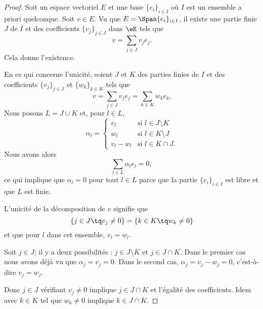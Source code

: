 \begin{proof}
    Soit un espace vectoriel \( E\) et une base \( \{ e_i \}_{i\in I}\) où \( I\) est un ensemble a priori quelconque. Soit \( v\in E\). Vu que \( E=\Span\{ e_i \}_{i\in I}\), il existe une partie finie \( J\) de \( I\) et des coefficients \( \{ v_j \}_{j\in J}\) dans \( \eK\) tels que
    \begin{equation}
        v=\sum_{j\in J}v_je_j.
    \end{equation}
    Cela donne l'existence.

    En ce qui concerne l'unicité, soient \( J \) et \( K\) des parties finies de \( I\) et des coefficients \( \{ v_j \}_{j\in J}\) et \( \{ w_{k} \}_{k\in K}\) tels que
    \begin{equation}
        v=\sum_{j\in J}v_je_j=\sum_{k\in K}w_{k}e_{k}.
    \end{equation}
    Nous posons \( L=J\cup K\) et, pour \( l\in L\),
    \begin{equation}
        \alpha_l=\begin{cases}
            v_l    &   \text{si } l\in J\setminus K\\
            w_l    &    \text{si } l\in K\setminus J\\
            v_l-w_l    &    \text{si } l\in K\cap J.
        \end{cases}
    \end{equation}
    Nous avons alors
    \begin{equation}
        \sum_{l\in L}\alpha_le_l=0,
    \end{equation}
    ce qui implique que \( \alpha_l=0\) pour tout \( l\in L\) parce que la partie \( \{ e_i \}_{i\in I}\) est libre et que \( L\) est finie.

    L'unicité de la décomposition de \( v\) signifie que
    \begin{equation}
        \{ j\in J \tq v_j\neq 0 \}=\{ k\in K\tq w_k\neq 0 \}
    \end{equation}
    et que pour \( l\) dans cet ensemble, \( v_l=w_l\).

    Soit \( j\in J\); il y a deux possibilités : \( j\in J\setminus K\) et \( j\in J\cap K\). Dans le premier cas nous avons déjà vu que \( \alpha_j=v_j=0\). Dans le second cas, \( \alpha_j=v_j-w_j=0\), c'est-à-dire \( v_j=w_j\).

    Donc \( j\in J\) vérifiant \( v_j\neq 0\) implique \( j\in J\cap K\) et l'égalité des coefficients. Idem avec \( k\in K\) tel que \( w_k\neq 0\) implique \( k\in J\cap K\).
\end{proof}

